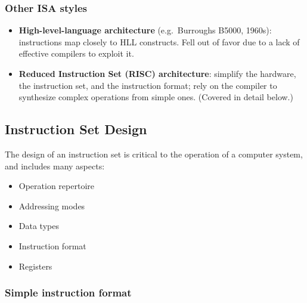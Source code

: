 \subsubsection{Other ISA styles}

\begin{itemize}
  \item \textbf{High-level-language architecture} (e.g.\ Burroughs B5000,
  1960s): instructions map closely to HLL constructs. Fell out of favor due
  to a lack of effective compilers to exploit it.
  \item \textbf{Reduced Instruction Set (RISC) architecture}: simplify the
  hardware, the instruction set, and the instruction format; rely on the
  compiler to synthesize complex operations from simple ones. (Covered in
  detail below.)
\end{itemize}

\subsection{Instruction Set Design}

The design of an instruction set is critical to the operation of a computer
system, and includes many aspects:
\begin{itemize}
  \item Operation repertoire
  \item Addressing modes
  \item Data types
  \item Instruction format
  \item Registers
\end{itemize}

\subsubsection{Simple instruction format}

\begin{center}
\end{center}

